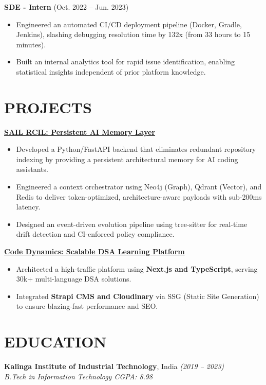 \documentclass[a4paper,10pt]{article}
\begin{document}
\vspace{0.05in}
\textbf{SDE - Intern} \hfill (Oct. 2022 – Jun. 2023)
\begin{itemize}
    \item Engineered an automated CI/CD deployment pipeline (Docker, Gradle, Jenkins), slashing debugging resolution time by 132x (from 33 hours to 15 minutes).
    \item Built an internal analytics tool for rapid issue identification, enabling statistical insights independent of prior platform knowledge.
\end{itemize}

\vspace{0.1in}
\section*{PROJECTS}
\textbf{\href{https://github.com/satyajeetramnit/sail-rcil}{SAIL RCIL: Persistent AI Memory Layer}}
\begin{itemize} 
    \item Developed a Python/FastAPI backend that eliminates redundant repository indexing by providing a persistent architectural memory for AI coding assistants.
    \item Engineered a context orchestrator using Neo4j (Graph), Qdrant (Vector), and Redis to deliver token-optimized, architecture-aware payloads with sub-200ms latency.
    \item Designed an event-driven evolution pipeline using tree-sitter for real-time drift detection and CI-enforced policy compliance.

\end{itemize}

\vspace{0.05in}
\textbf{\href{https://codedynamics.vercel.app/}{Code Dynamics: Scalable DSA Learning Platform}}
\begin{itemize}
    \item Architected a high-traffic platform using \textbf{Next.js and TypeScript}, serving 30k+ multi-language DSA solutions.
    \item Integrated \textbf{Strapi CMS and Cloudinary} via SSG (Static Site Generation) to ensure blazing-fast performance and SEO.

\end{itemize}

\vspace{0.1in}
\section*{EDUCATION}
\textbf{Kalinga Institute of Industrial Technology}, India \hfill \textit{(2019 – 2023)} \\
\textit{B.Tech in Information Technology \hfill CGPA: 8.98}
\end{document}

